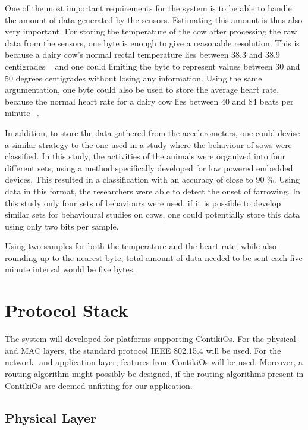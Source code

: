 \documentclass[conference]{IEEEtran}
\begin{document}
One of the most important requirements for the system is to be able to handle
the amount of data generated by the sensors. Estimating this amount is thus
also very important. For storing the temperature of the cow after processing
the raw data from the sensors, one byte is enough to give a reasonable
resolution. This is because a dairy cow’s normal rectal temperature lies
between 38.3 and 38.9 centigrades ~\cite{wiki_bov} and one could limiting the
byte to represent values between 30 and 50 degrees centigrades without losing
any information.  Using the same argumentation, one byte could also be used to
store the average heart rate, because the normal heart rate for a dairy cow
lies between 40 and 84 beats per minute ~\cite{wiki_bov}.

In addition, to store the data gathered from the accelerometers, one could
devise a similar strategy to the one used in a study where the behaviour of
sows were classified.\cite{marchioro_sows_2011} In this study, the activities
of the animals were organized into four different sets, using a method
specifically developed for low powered embedded devices. This resulted in
a classification with an accuracy of close to 90 \%. Using data in this format,
the researchers were able to detect the onset of farrowing. In this study only
four sets of behaviours were used, if it is possible to develop similar sets
for behavioural studies on cows, one could potentially store this data using
only two bits per sample.

Using two samples for both the temperature and the heart rate, while also
rounding up to the nearest byte, total amount of data needed to be sent each
five minute interval would be five bytes.


\section{Protocol Stack}

The system will developed for platforms supporting ContikiOs. For the
physical- and MAC layers, the standard protocol IEEE 802.15.4
\cite{ieee_computer_society_ieee_2011} will be used.  For the network- and
application layer, features from ContikiOs will be used.  Moreover, a routing
algorithm might possibly be designed, if the routing algorithms present in
ContikiOs are deemed unfitting for our application.

\subsection{Physical Layer}
\end{document}

